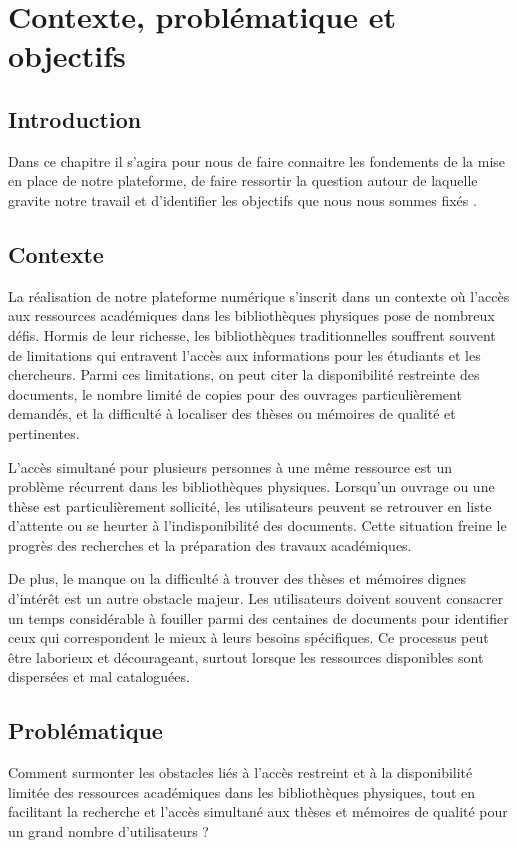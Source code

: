 \chapter{Contexte, problématique et objectifs}
\adjustmtc
\thispagestyle{MyStyle}
\section*{Introduction}
Dans ce chapitre il s'agira pour nous de faire connaitre les fondements de la mise en place de notre plateforme, de faire ressortir la question autour de laquelle gravite notre travail et d'identifier les objectifs que nous nous sommes fixés . \par
\section{Contexte}
La réalisation de notre plateforme numérique s'inscrit dans un contexte où l'accès aux ressources académiques dans les bibliothèques physiques pose de nombreux défis. Hormis de leur richesse, les bibliothèques traditionnelles souffrent souvent de limitations qui entravent l'accès aux informations pour les étudiants et les chercheurs. Parmi ces limitations, on peut citer la disponibilité restreinte des documents, le nombre limité de copies pour des ouvrages particulièrement demandés, et la difficulté à localiser des thèses ou mémoires de qualité et pertinentes.\par
L'accès simultané pour plusieurs personnes à une même ressource est un problème récurrent dans les bibliothèques physiques. Lorsqu'un ouvrage ou une thèse est particulièrement sollicité, les utilisateurs peuvent se retrouver en liste d'attente ou se heurter à l'indisponibilité des documents. Cette situation freine le progrès des recherches et la préparation des travaux académiques.\par
De plus, le manque ou la difficulté à trouver des thèses et mémoires dignes d'intérêt est un autre obstacle majeur. Les utilisateurs doivent souvent consacrer un temps considérable à fouiller parmi des centaines de documents pour identifier ceux qui correspondent le mieux à leurs besoins spécifiques. Ce processus peut être laborieux et décourageant, surtout lorsque les ressources disponibles sont dispersées et mal cataloguées.
\par
\section{Problématique}
Comment surmonter les obstacles liés à l'accès restreint et à la disponibilité limitée des ressources académiques dans les bibliothèques physiques, tout en facilitant la recherche et l'accès simultané aux thèses et mémoires de qualité pour un grand nombre d’utilisateurs ?\par
